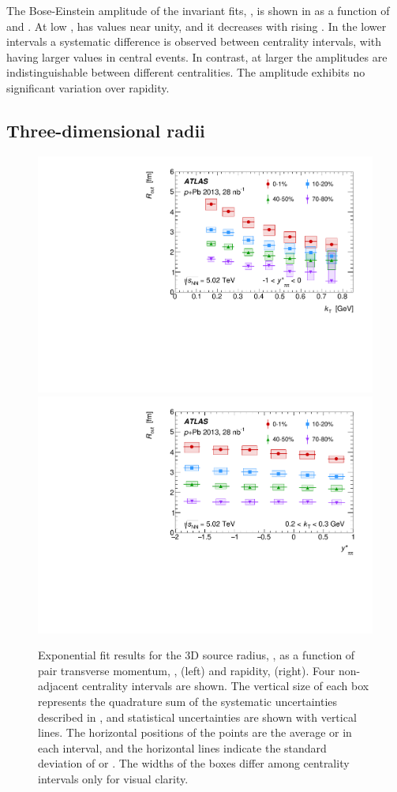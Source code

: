 The Bose-Einstein amplitude of the invariant fits, \linv, is shown in  as a function of \kt and \kys.
At low \kt, \linv has values near unity, and it decreases with rising \kt.
In the lower \kt intervals a systematic difference is observed between centrality intervals, with \linv having larger values in central events.
In contrast, at larger \kt the amplitudes are indistinguishable between different centralities.
The amplitude exhibits no significant variation over rapidity.

\FloatBarrier
\subsection{Three-dimensional radii}
\label{subsec:3d_results}

\begin{figure}[ht]
\centering
\includegraphics[width=.49\linewidth]{canqosl_Rout_vs_kt.pdf}
\includegraphics[width=.49\linewidth]{canqosl_Rout_vs_kys.pdf}
\caption{Exponential fit results for the 3D source radius, \Rout, as a function of pair transverse momentum, \kt, (left) and rapidity, \kys (right). Four non-adjacent centrality intervals are shown. The vertical size of each box represents the quadrature sum of the systematic uncertainties described in , and statistical uncertainties are shown with vertical lines. The horizontal positions of the points are the average \kt or \kys in each interval, and the horizontal lines indicate the standard deviation of \kt or \kys. The widths of the boxes differ among centrality intervals only for visual clarity.}
\label{fig:results_Rout}
\end{figure}

